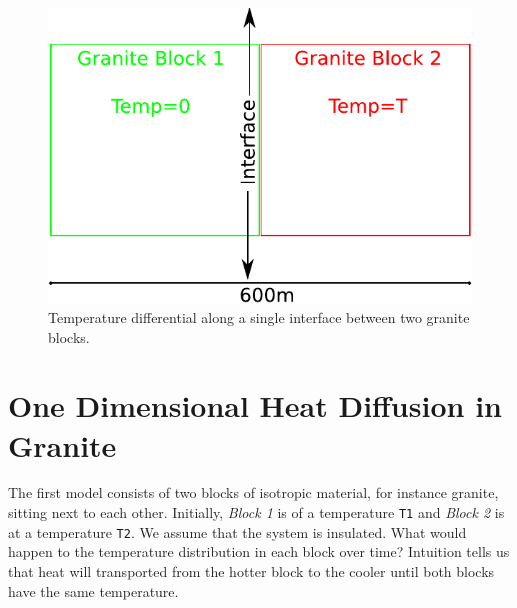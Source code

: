 
%
%
%

\begin{figure}[h!]
\centerline{\includegraphics[width=4.in]{figures/onedheatdiff001}}
\caption{Temperature differential along a single interface between two granite blocks.}
\label{fig:onedgbmodel}
\end{figure}

\section{One Dimensional Heat Diffusion in Granite}
\label{Sec:1DHDv00}

The first model consists of two blocks of isotropic material, for instance granite, sitting next to each other.
Initially, \textit{Block 1} is of a temperature
\verb|T1| and \textit{Block 2} is at a temperature \verb|T2|.
We assume that the system is insulated.
What would happen to the temperature distribution in each block over time? 
Intuition tells us that heat will transported from the hotter block to the cooler until both
blocks have the same temperature.

